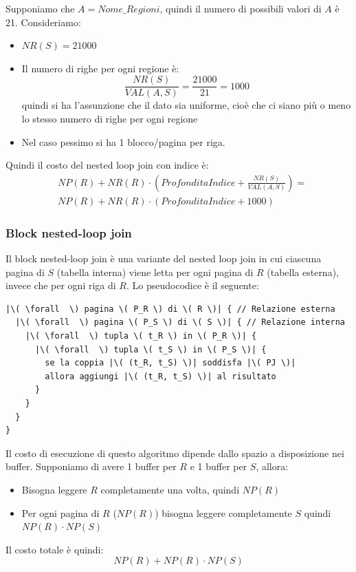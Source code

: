 \documentclass[a4paper]{article}
\begin{document}
\begin{example}
  Supponiamo che \( A = Nome\_Regioni \), quindi il numero di possibili valori di
  \( A \) è 21. Consideriamo:
  \begin{itemize}
    \item \( NR(S) = 21000 \) 
    \item Il numero di righe per ogni regione è:
      \[
        \frac{NR(S)}{VAL(A,S)} = \frac{21000}{21} = 1000
      \] 
      quindi si ha l'assunzione che il dato sia uniforme, cioè che ci siano più o
      meno lo stesso numero di righe per ogni regione
    \item Nel caso pessimo si ha 1 blocco/pagina per riga.
  \end{itemize}
  Quindi il costo del nested loop join con indice è:
  \[
    \begin{aligned}
      &NP(R) + NR(R) \cdot \left( ProfonditaIndice + \frac{NR(S)}{VAL(A,S)} \right) =\\
      &NP(R) + NR(R) \cdot \left( ProfonditaIndice + 1000 \right)
    \end{aligned}
  \]

\end{example}

\subsubsection*{Block nested-loop join}
Il block nested-loop join è una variante del nested loop join in cui ciascuna pagina
di \( S \) (tabella interna) viene letta per ogni pagina di \( R \) (tabella esterna),
invece che per ogni riga di \( R \). Lo pseudocodice è il seguente:
\begin{lstlisting}[escapechar=|, basicstyle=\rmfamily, columns=fullflexible, keepspaces=true]
|\( \forall  \) pagina \( P_R \) di \( R \)| { // Relazione esterna
  |\( \forall  \) pagina \( P_S \) di \( S \)| { // Relazione interna
    |\( \forall  \) tupla \( t_R \) in \( P_R \)| {
      |\( \forall  \) tupla \( t_S \) in \( P_S \)| {
        se la coppia |\( (t_R, t_S) \)| soddisfa |\( PJ \)|
        allora aggiungi |\( (t_R, t_S) \)| al risultato
      }
    }
  }
}
\end{lstlisting}

\noindent
Il costo di esecuzione di questo algoritmo dipende dallo spazio a disposizione nei
buffer. Supponiamo di avere 1 buffer per \( R \) e 1 buffer per \( S \), allora:
\begin{itemize}
  \item Bisogna leggere \( R \) completamente una volta, quindi \( NP(R) \)
  \item Per ogni pagina di \( R \) (\( NP(R) \)) bisogna leggere completamente \( S \)
    quindi \( NP(R) \cdot NP(S) \)
\end{itemize}
Il costo totale è quindi:
\[
  NP(R) + NP(R) \cdot NP(S)
\] 
\end{document}
